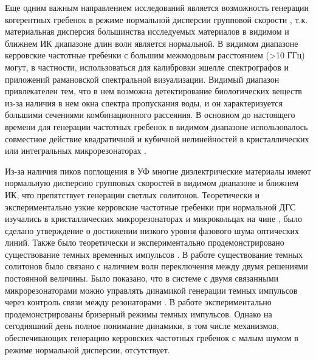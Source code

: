 Еще одним важным направлением исследований является возможность генерации когерентных гребенок в режиме нормальной дисперсии групповой скорости \cite{Xue2016nano}, т.к. материальная дисперсия большинства исследуемых материалов в видимом и ближнем ИК диапазоне длин волн является нормальной. В видимом диапазоне керровские частотные гребенки с большим межмодовым расстоянием (>10 ГГц) могут, в частности, использоваться для калибровки эшелле спектрографов \cite{Benedick2010,Glenday2015} и приложений рамановской спектральной визуализации. Видимый диапазон привлекателен тем, что в нем возможна детектирование биологических веществ \cite{Karpov2018} из-за наличия в нем окна спектра пропускания воды, и он характеризуется большими сечениями комбинационного рассеяния. В основном до настоящего времени для генерации частотных гребенок в видимом диапазоне использовалось совместное действие квадратичной и кубичной нелинейностей в кристаллических или интегральных микрорезонаторах \cite{Miller2014,Jung2014}.

Из-за наличия пиков поглощения в УФ многие диэлектрические материалы имеют нормальную дисперсию групповых скоростей в видимом диапазоне и ближнем ИК, что препятствует генерации светлых солитонов. Теоретически и экспериментально узкие керровские частотные гребенки при нормальной ДГС изучались в кристаллических микрорезонаторах \cite{Coillet2013,Liang2014,Henriet2015} и микрокольцах на чипе \cite{Huang2015prl,Xue2015}, было сделано утверждение о достижении низкого уровня фазового шума оптических линий. Также было теоретически и экспериментально продемонстрировано существование темных временных импульсов \cite{Godey2014,ParraRivas2016}. В работе \cite{ParraRivas2016} существование темных солитонов было связано с наличием волн переключения между двумя решениями постоянной величины. Было показано, что в системе с двумя связанными микрорезонаторами можно управлять динамикой генерации темных импульсов через контроль связи между резонаторами \cite{Liu2015}. В работе \cite{PhysRevLett.121.257401} экспериментально продемонстрированы бризерный режимы темных импульсов. Однако на сегодняшний день полное понимание динамики, в том числе механизмов, обеспечивающих генерацию керровских частотных гребенок с малым шумом в режиме нормальной дисперсии, отсутствует.

